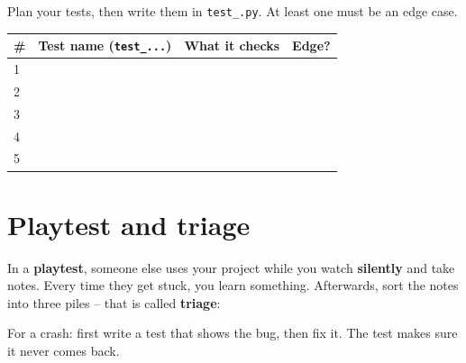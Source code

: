 \begin{exercise}
Plan your tests, then write them in \texttt{test\_<your project>.py}. At least one must be an edge case.
\begin{center}\small
\begin{tabular}{|p{0.5cm}|p{6.3cm}|p{5cm}|p{1.4cm}|}
\hline
\# & \textbf{Test name} (\texttt{test\_...}) & \textbf{What it checks} & \textbf{Edge?}\\ \hline
1 & & & \\[0.4cm] \hline
2 & & & \\[0.4cm] \hline
3 & & & \\[0.4cm] \hline
4 & & & \\[0.4cm] \hline
5 & & & \\[0.4cm] \hline
\end{tabular}
\end{center}
\end{exercise}

\section{Playtest and triage}
In a \textbf{playtest}, someone else uses your project while you watch \textbf{silently} and take notes. Every time they get stuck, you learn something. Afterwards, sort the notes into three piles -- that is called \textbf{triage}:
\begin{center}
\end{center}
For a crash: first write a test that shows the bug, then fix it. The test makes sure it never comes back.

